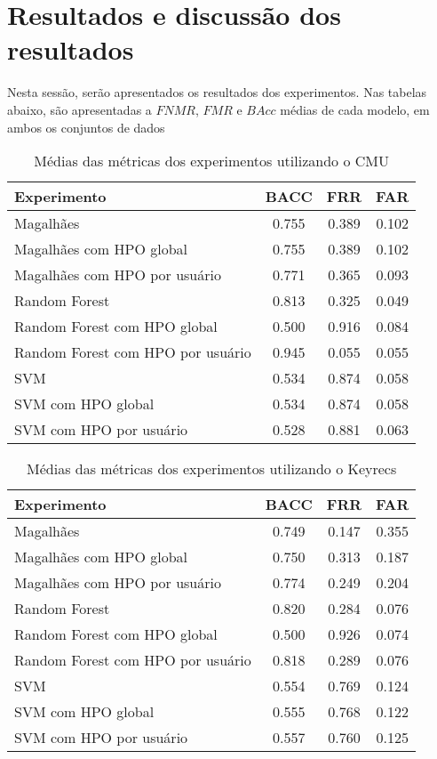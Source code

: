 \section{Resultados e discussão dos resultados}\label{sec:resultados}

Nesta sessão, serão apresentados os resultados dos experimentos. Nas tabelas abaixo, são apresentadas a $FNMR$, $FMR$ e $BAcc$ médias de cada modelo, em ambos os conjuntos de dados

\begin{table}[htbp]
\centering
\caption{Médias das métricas dos experimentos utilizando o CMU}
\label{tab:exp_metric_averages_cmu}
\begin{tabular}{|l|c|c|c|}
\hline
\textbf{Experimento} & \textbf{BACC} & \textbf{FRR} & \textbf{FAR} \\
\hline
Magalhães & 0.755 & 0.389 & 0.102 \\
\hline
Magalhães com HPO global & 0.755 & 0.389 & 0.102 \\
\hline
Magalhães com HPO por usuário & 0.771 & 0.365 & 0.093 \\
\hline
Random Forest & 0.813 & 0.325 & 0.049 \\
\hline
Random Forest com HPO global & 0.500 & 0.916 & 0.084 \\
\hline
Random Forest com HPO por usuário & 0.945 & 0.055 & 0.055 \\
\hline
SVM & 0.534 & 0.874 & 0.058 \\
\hline
SVM com HPO global & 0.534 & 0.874 & 0.058 \\
\hline
SVM com HPO por usuário & 0.528 & 0.881 & 0.063 \\
\hline
\end{tabular}
\end{table}

\begin{table}[htbp]
\centering
\caption{Médias das métricas dos experimentos utilizando o Keyrecs}
\label{tab:exp_metric_averages_keyrecs}
\begin{tabular}{|l|c|c|c|}
\hline
\textbf{Experimento} & \textbf{BACC} & \textbf{FRR} & \textbf{FAR} \\
\hline
Magalhães & 0.749 & 0.147 & 0.355 \\
\hline
Magalhães com HPO global & 0.750 & 0.313 & 0.187 \\
\hline
Magalhães com HPO por usuário & 0.774 & 0.249 & 0.204 \\
\hline
Random Forest & 0.820 & 0.284 & 0.076 \\
\hline
Random Forest com HPO global & 0.500 & 0.926 & 0.074 \\
\hline
Random Forest com HPO por usuário & 0.818 & 0.289 & 0.076 \\
\hline
SVM & 0.554 & 0.769 & 0.124 \\
\hline
SVM com HPO global & 0.555 & 0.768 & 0.122 \\
\hline
SVM com HPO por usuário & 0.557 & 0.760 & 0.125 \\
\hline
\end{tabular}
\end{table}

